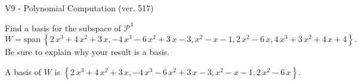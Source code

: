 \begin{exercise}
  \begin{exerciseTitle}V9 - Polynomial Computation (ver. 517)\end{exerciseTitle}
  \begin{exerciseStatement}
    Find a basis for the subspace of \(\mathcal{P}^3\) 
\[W=\mathrm{span}\ \left\{2 \, x^{3} + 4 \, x^{2} + 3 \, x , -4 \, x^{3} - 6 \, x^{2} + 3 \, x - 3 , x^{2} - x - 1 , 2 \, x^{2} - 6 \, x , 4 \, x^{3} + 3 \, x^{2} + 4 \, x + 4\right\}.\]
 Be sure to explain why your result is a basis.


  \end{exerciseStatement}
  \begin{exerciseAnswer}
   A basis of \(W\) is  \(\left\{2 \, x^{3} + 4 \, x^{2} + 3 \, x , -4 \, x^{3} - 6 \, x^{2} + 3 \, x - 3 , x^{2} - x - 1 , 2 \, x^{2} - 6 \, x\right\}\).
  


  \end{exerciseAnswer}
\end{exercise}